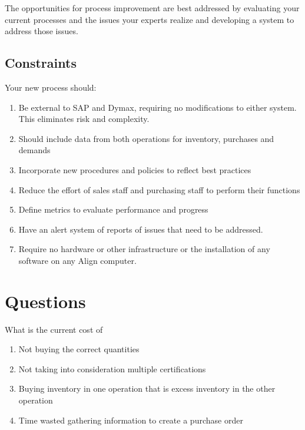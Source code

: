 \documentclass[letterpaper,10pt,english]{sphinxmanual}
\begin{document}
The opportunities for process improvement are best addressed by
evaluating your current processes and the issues your experts realize
and developing a system to address those issues.


\section{Constraints}
\label{FutureState:constraints}
Your new process should:
\begin{enumerate}
\item {} 
Be external to SAP and Dymax, requiring no modifications to either
system. This eliminates risk and complexity.

\item {} 
Should include data from both operations for inventory, purchases and
demands

\item {} 
Incorporate new procedures and policies to reflect best practices

\item {} 
Reduce the effort of sales staff and purchasing staff to perform
their functions

\item {} 
Define metrics to evaluate performance and progress

\item {} 
Have an alert system of reports of issues that need to be addressed.

\item {} 
Require no hardware or other infrastructure or the installation of
any software on any Align computer.

\end{enumerate}


\chapter{Questions}
\label{FutureState:id1}
What is the current cost of
\begin{enumerate}
\item {} 
Not buying the correct quantities

\item {} 
Not taking into consideration multiple certifications

\item {} 
Buying inventory in one operation that is excess inventory in the
other operation

\item {} 
Time wasted gathering information to create a purchase order

\end{enumerate}
\end{document}
